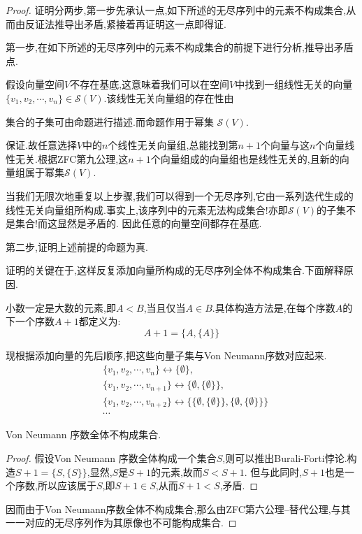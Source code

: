 \begin{proof}
  证明分两步,第一步先承认一点,如下所述的无尽序列中的元素不构成集合,从而由反证法推导出矛盾,紧接着再证明这一点即得证.

  第一步,在如下所述的无尽序列中的元素不构成集合的前提下进行分析,推导出矛盾点.

  假设向量空间$V$不存在基底,这意味着我们可以在空间$V$中找到一组线性无关的向量$\{v_1,v_2,\cdots,v_n\}\in \mathscr{S}(V)$.该线性无关向量组的存在性由
  \begin{axiom}
      集合的子集可由命题进行描述.而命题作用于幂集 $\mathscr{S}(V)$.
  \end{axiom}
  保证.故任意选择$V$中的$n$个线性无关向量组,总能找到第$n+1$个向量与这$n$个向量线性无关.根据ZFC第九公理,这$n+1$个向量组成的向量组也是线性无关的,且新的向量组属于幂集$\mathscr{S}(V)$.

  当我们无限次地重复以上步骤,我们可以得到一个无尽序列,它由一系列迭代生成的线性无关向量组所构成.事实上,该序列中的元素无法构成集合!亦即$\mathscr{S}(V)$的子集不是集合!而这显然是矛盾的.
  因此任意的向量空间都存在基底.

  第二步,证明上述前提的命题为真.

    证明的关键在于,这样反复添加向量所构成的无尽序列全体不构成集合.下面解释原因.
    \begin{definition}
      小数一定是大数的元素,即$A<B$,当且仅当$A\in B$.具体构造方法是,在每个序数$A$的下一个序数$A+1$都定义为:
      \[A+1=\{A,\{A\}\}\]
    \end{definition}
    现根据添加向量的先后顺序,把这些向量子集与Von Neumann序数对应起来.
    \begin{equation}
      \begin{split}
        &\{v_1,v_2,\cdots,v_n\} \longleftrightarrow \{\emptyset\},\\
        &\{v_1,v_2,\cdots,v_{n+1}\} \longleftrightarrow \{\emptyset,\{\emptyset\}\},\\
        &\{v_1,v_2,\cdots,v_{n+2}\} \longleftrightarrow \{\{\emptyset,\{\emptyset\}\},\{\emptyset,\{\emptyset\}\}\}\\
        &\cdots
      \end{split}
    \end{equation}
    \begin{proposition}[][prop:1.4.1]
    Von Neumann 序数全体不构成集合.
    \end{proposition}
    \begin{proof}
      假设Von Neumann 序数全体构成一个集合$S$,则可以推出Burali-Forti悖论.构造$S+1=\{S,\{S\}\}$,显然,$S$是$S+1$的元素,故而$S<S+1$.
      但与此同时,$S+1$也是一个序数,所以应该属于$S$,即$S+1\in S$,从而$S+1<S$,矛盾.
    \end{proof}
    因而由于Von Neumann序数全体不构成集合,那么由ZFC第六公理--替代公理,与其一一对应的无尽序列作为其原像也不可能构成集合.
\end{proof}
